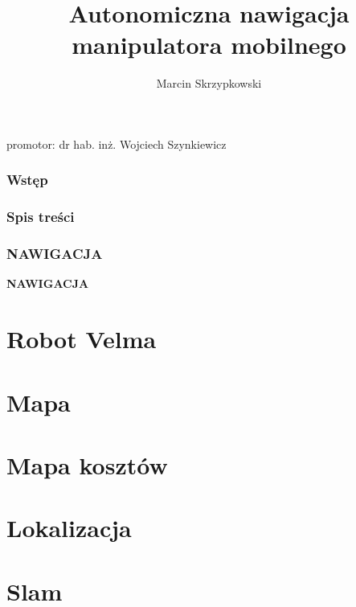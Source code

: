 \documentclass[aspectratio=169,11pt]{beamer}
\author{Marcin Skrzypkowski}
\title{Autonomiczna nawigacja manipulatora mobilnego}
\makeatletter
\newcommand{\stopnavigation}{\addtocontents{nav}{\string\let\string\headcommand\string\@gobble}}
\makeatother
\begin{document}
{
\begin{frame}
\titlepage
	\begin{center}
		promotor: dr hab. inż. Wojciech Szynkiewicz
	\end{center}
\end{frame}
}

{
\begin{frame}
\frametitle{Wstęp}
\end{frame}
}

{
\begin{frame}
\frametitle{Spis treści}
\tableofcontents
\end{frame}
}


{
\begin{frame}
\frametitle{NAWIGACJA}
	\begin{center}
		\LARGE{\textbf{NAWIGACJA}}
	\end{center}
\end{frame}
}


\section{Robot Velma}


\section{Mapa}


\section{Mapa kosztów}


\section{Lokalizacja}


\section{Slam}

\end{document}
